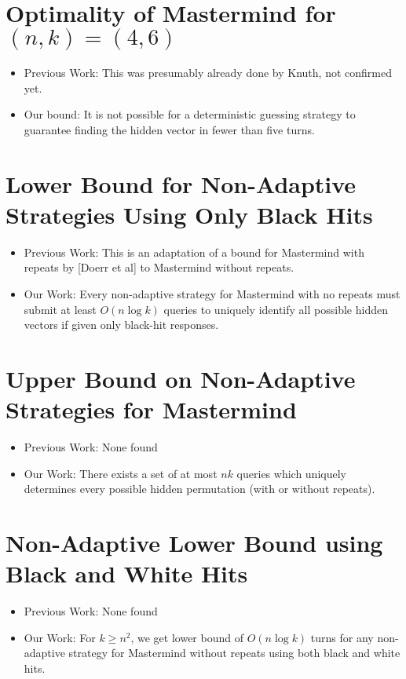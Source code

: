 \documentclass[12pt, a4paper]{article}
\begin{document}
\section*{Optimality of Mastermind for $(n, k) = (4, 6)$}
	\begin{itemize}
	\item Previous Work: This was presumably already done by Knuth, not confirmed yet.
	\item Our bound: It is not
	possible for a deterministic guessing strategy to guarantee finding the
	hidden vector in fewer than five turns.

	\end{itemize}
\clearpage
\section*{Lower Bound for Non-Adaptive Strategies Using Only Black Hits}

\begin{itemize}
	\item Previous Work: This is an adaptation of a bound for Mastermind with repeats by [Doerr et al] to Mastermind without repeats.
	\item Our Work: Every non-adaptive strategy for Mastermind with no repeats must submit at least
$O(n \log k)$ queries to uniquely identify all possible hidden vectors if given only black-hit responses.
\end{itemize}

\section*{Upper Bound on Non-Adaptive Strategies for Mastermind}
\begin{itemize}
	\item Previous Work: None found
	\item Our Work: There exists a set of at most $n k$ queries which uniquely determines every
possible hidden permutation (with or without repeats).
\end{itemize}

\section*{Non-Adaptive Lower Bound using Black and White Hits}
\begin{itemize}
	\item Previous Work: None found
	\item Our Work: For $k \ge n^2$, we get lower bound of $O(n\log k)$ turns for any non-adaptive strategy for
Mastermind without repeats using both black and white hits.
\end{itemize}
\end{document}
